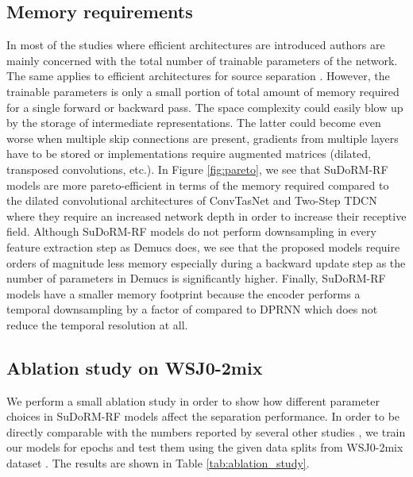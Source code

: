 \documentclass{article}
\theoremstyle{definition}
\newcommand{\sudo}{SuDoRM-RF }
\begin{document}
\subsection{Memory requirements}
In most of the studies where efficient architectures are introduced \cite{howard2017mobilenets, chollet2017xception_depthwiseseparable, mehta2019espnetv2, yu2019slimmablenets} authors are mainly concerned with the total number of trainable parameters of the network. The same applies to efficient architectures for source separation \cite{luo2019convTasNet, luo2019dual, maldonado2020lightweight}. However, the trainable parameters is only a small portion of total amount of memory required for a single forward or backward pass. The space complexity could easily blow up by the storage of intermediate representations. The latter could become even worse when multiple skip connections are present, gradients from multiple layers have to be stored or implementations require augmented matrices (dilated, transposed convolutions, etc.). In Figure \ref{fig:pareto}, we see that \sudo models are more pareto-efficient in terms of the memory required compared to the dilated convolutional architectures of ConvTasNet \cite{luo2019convTasNet} and Two-Step TDCN \cite{tzinis2019two} where they require an increased network depth in order to increase their receptive field. Although \sudo models do not perform downsampling in every feature extraction step as Demucs \cite{defossez2019demucs} does, we see that the proposed models require orders of magnitude less memory especially during a backward update step as the number of parameters in Demucs is significantly higher. Finally, \sudo models have a smaller memory footprint because the encoder  performs a temporal downsampling by a factor of  compared to DPRNN \cite{luo2019dual} which does not reduce the temporal resolution at all.   



\subsection{Ablation study on WSJ0-2mix}
We perform a small ablation study in order to show how different parameter choices in \sudo models affect the separation performance. In order to be directly comparable with the numbers reported by several other studies  \cite{luo2019convTasNet, luo2019dual, zeghidour2020wavesplit, liu2019DeepCASA}, we train our models for  epochs and test them using the given data splits from WSJ0-2mix dataset \cite{hershey2016deepclustering}. The results are shown in Table \ref{tab:ablation_study}.
\end{document}
